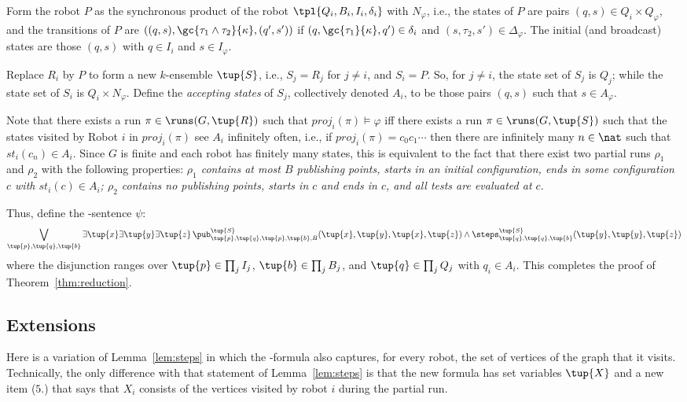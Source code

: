   
  Form the robot $P$ as the synchronous product of the robot $\tpl{Q_i,B_i,I_i,\delta_i}$ with $N_\varphi$, 
  i.e., the states of $P$ are pairs $(q,s) \in Q_i \times Q_\varphi$, and 
  the transitions of $P$ are 
  $((q,s), \gc{\tau_1 \wedge \tau_2}{\kappa},(q',s'))$ if $(q,\gc{\tau_1}{\kappa},q') \in \delta_i$ and $(s,\tau_2,s') \in \Delta_\varphi$. 
  The initial (and broadcast) states are those $(q,s)$ with $q \in I_i$ and $s \in I_\varphi$.
  
  Replace $R_i$ by $P$ to form a new $k$-ensemble $\tup{S}$, i.e., $S_j = R_j$ for $j \neq i$, and $S_i = P$. So, for $j \neq i$, the state set of $S_j$ is $Q_j$; while the state set of $S_i$ is $Q_i \times N_\varphi$. Define the \emph{accepting states} of $S_j$, collectively denoted $A_i$, to be those pairs $(q,s)$ such that $s \in A_\varphi$.
      
  Note that there exists a run $\pi \in \runs(G,\tup{R})$ such that $proj_i(\pi) \models \varphi$ iff there exists a run $\pi \in \runs(G,\tup{S})$ such that the states visited by Robot $i$ in $proj_i(\pi)$ see $A_i$ infinitely often, i.e., if $proj_i(\pi) = c_0 c_1 \cdots$ then there are infinitely many $n \in \nat$ such that $st_i(c_n) \in A_i$. Since $G$ is finite and each robot has finitely many states, this is equivalent to the fact that there exist two partial runs $\rho_1$
  and $\rho_2$ with the following properties:
  \it
  \- $\rho_1$ contains at most $B$ publishing points, starts in an initial configuration, ends in some configuration $c$ with $st_i(c) \in A_i$;
  \- $\rho_2$ contains no publishing points, starts in $c$ and ends in $c$, and all tests are evaluated at $c$.
  \ti 
 
 Thus, define the \msol-sentence $\psi$:
 \[
\bigvee_{\tup{p},\tup{q},\tup{b}} \exists \tup{x} \exists \tup{y} \exists \tup{z}\, 
\pub^{\tup{S}}_{\tup{p},\tup{q},\tup{p},\tup{b},B}(\tup{x},\tup{y},\tup{x},\tup{z}) \wedge 
\steps^{\tup{S}}_{\tup{q},\tup{q},\tup{b}}(\tup{y},\tup{y},\tup{z})
 \]
where the disjunction ranges over $\tup{p} \in \prod_j I_j$, $\tup{b} \in \prod_j B_j$, and $\tup{q} \in \prod_j Q_j$ with $q_i \in A_i$. 
This completes the proof of Theorem~\ref{thm:reduction}.
\subsection{Extensions}

Here is a variation of Lemma~\ref{lem:steps} in which the \msol-formula also captures, for every robot, the set of vertices of the graph that it visits. Technically, the only difference with that statement of Lemma~\ref{lem:steps} is that the new formula has set variables $\tup{X}$ and a new item ($5.$) that says that $X_i$ consists of the vertices visited by robot $i$ during the partial run.

